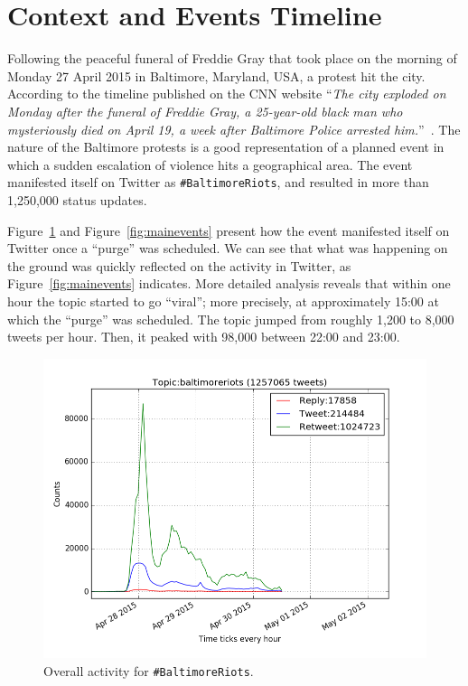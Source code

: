 \documentclass[conference]{IEEEtran}
\begin{document}
\section{Context and Events Timeline}\label{context}

Following the peaceful funeral of Freddie Gray that took place on the
morning of Monday 27 April 2015 in Baltimore, Maryland, USA, a protest
hit the city. According to the timeline published on the CNN website
``{\emph{The city exploded on Monday after the funeral of Freddie
Gray, a 25-year-old black man who mysteriously died on April 19, a
week after Baltimore Police arrested
him.}}''~\cite{baltimorewiki:2015}. The nature of the Baltimore protests
is a good representation of a planned event in which a sudden
escalation of violence hits a geographical area. The event manifested
itself on Twitter as {\texttt{\#BaltimoreRiots}}, and resulted in more
than 1,250,000 status updates.

Figure~\ref{fig:overallactivity} and Figure~\ref{fig:mainevents}
present how the event manifested itself on Twitter once a ``purge'' was
scheduled. We can see that what was happening on the ground was
quickly reflected on the activity in Twitter, as
Figure~\ref{fig:mainevents} indicates. More detailed analysis reveals
that within one hour the topic started to go ``viral''; more
precisely, at approximately 15:00 at which the ``purge'' was
scheduled. The topic jumped from roughly 1,200 to 8,000 tweets per
hour. Then, it peaked with 98,000 between 22:00 and 23:00.

\begin{figure}[!htb]
\centering
\includegraphics[width=\columnwidth]{images/overallactivity.png}
\caption{Overall activity for {\texttt{\#BaltimoreRiots}}.}
\label{fig:overallactivity}
\end{figure}
\end{document}
